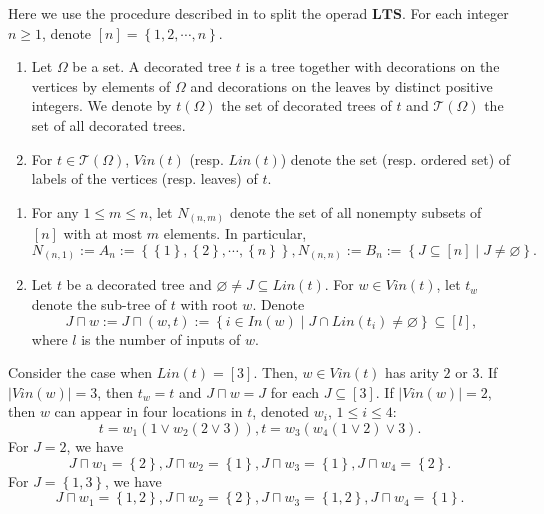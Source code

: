 \documentclass[11pt, twoside]{article}
\begin{document}
Here we use the procedure described in \cite{PBG13} to split the operad $\mathbf{LTS} $. For each integer $n\geq 1$, denote $[n]=\left\{1,2,\cdots,n \right\}. $

\begin{defi}
    \begin{enumerate}
        \item Let $\Omega $ be a set. A decorated tree $t$ is a tree together with  decorations on the vertices  by elements of $\Omega$ and  decorations on the leaves  by distinct positive integers. We denote by $t(\Omega) $ the set of decorated trees of $t$ and $\mathcal{T}(\Omega) $ the set of all decorated trees.
        \item For $t\in \mathcal{T}(\Omega)$, $Vin(t) $ (resp. $Lin(t)$) denote the set (resp. ordered set) of labels of the vertices (resp. leaves) of $t$.
    \end{enumerate}
\end{defi}

\begin{defi}
    \begin{enumerate}
        \item For any $1\leq m\leq n $, let $N_{(n,m)} $ denote the set of all nonempty subsets of $[n] $ with at most $m$ elements. In particular, $$N_{(n,1)}:= A_n:=\left\{\left\{1 \right\}, \left\{2 \right\},\cdots, \left\{n \right\} \right\}, N_{(n,n)}:= B_n:= \left\{J\subseteq [n] \mid J\neq \varnothing \right\}. $$
        \item Let $t$ be a decorated tree and $\varnothing \neq J\subseteq L{in}(t). $ For $w\in V{in}(t) $, let $t_w$ denote the sub-tree of $t$ with root $w$. Denote $$J \sqcap w:=J\sqcap (w,t):=\left\{ i\in In(w)\mid J\cap Lin(t_i)\neq \varnothing \right\}\subseteq [l] ,$$ where $l$ is the number of inputs of $w$.
    \end{enumerate}
\end{defi}

\begin{ex}\cite{PBG13}
    Consider the case when $Lin(t)= [3] $. Then,  $w\in Vin(t) $  has arity $2$ or $3$. If $\left | Vin(w)\right |=3  $, then $t_w=t$ and $J\sqcap w= J $ for each $J\subseteq [3] $. If $ \left | Vin(w)\right |=2 $, then $w$ can appear  in four locations in $t$, denoted $w_i$, $1\leq i\leq 4$: $$t= w_1(1\vee w_2(2\vee 3)), t= w_3(w_4(1\vee 2)\vee 3). $$ For $J=2$, we have $$J\sqcap w_1= \left\{2\right\}, J\sqcap w_2= \left\{1\right\}, J\sqcap w_3= \left\{1\right\}, J\sqcap w_4= \left\{2\right\}. $$ For $J= \left\{1,3 \right\}$, we have $$J\sqcap w_1= \left\{1,2\right\}, J\sqcap w_2= \left\{2\right\}, J\sqcap w_3= \left\{1,2\right\}, J\sqcap w_4= \left\{1\right\}. $$
\end{ex}
\end{document}
